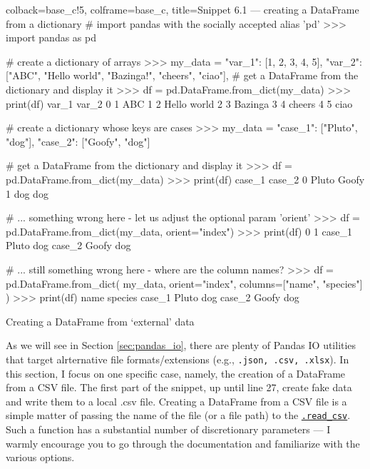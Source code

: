 \documentclass[a4paper,11pt]{book}
\numberwithin{figure}{chapter}
\numberwithin{table}{chapter}
\newcommand{\question}[1]{%
    \begin{tcolorbox}[colback=comp_c!10,colframe=comp_c,sidebyside align=top,width=\linewidth,before skip=1ex]
        #1
    \end{tcolorbox}
    \switchcolumn%
}
\newcommand{\note}[1]{%
    \begin{tcolorbox}[colback=white!0,colframe=white!10,width=\linewidth,before skip=1ex]
        #1
    \end{tcolorbox}
}
\begin{document}
\begin{pythoncode}[linenos=true,]{colback=base_c!5, colframe=base_c, title=\sffamily Snippet 6.1 --- creating a DataFrame from a dictionary}
# import pandas with the socially accepted alias 'pd'
>>> import pandas as pd

# create a dictionary of arrays
>>> my_data = {
        "var_1": [1, 2, 3, 4, 5],
        "var_2": ["ABC", "Hello world", "Bazinga!", "cheers", "ciao"],
    }
# get a DataFrame from the dictionary and display it
>>> df = pd.DataFrame.from_dict(my_data)
>>> print(df)
   var_1        var_2
0      1          ABC
1      2  Hello world
2      3      Bazinga
3      4       cheers
4      5         ciao

# create a dictionary whose keys are cases 
>>> my_data = {"case_1": ["Pluto", "dog"], "case_2": ["Goofy", "dog"]}


# get a DataFrame from the dictionary and display it
>>> df = pd.DataFrame.from_dict(my_data)
>>> print(df)
   case_1   case_2
0   Pluto    Goofy
1     dog      dog

# ... something wrong here - let us adjust the optional param 'orient'
>>> df = pd.DataFrame.from_dict(my_data, orient="index")
>>> print(df)
            0       1
case_1  Pluto     dog
case_2  Goofy     dog

# ... still something wrong here - where are the column names?
>>> df = pd.DataFrame.from_dict(
	my_data, orient="index",
	columns=["name", "species"]
	)
>>> print(df)
         name  species
case_1  Pluto      dog
case_2  Goofy      dog

\end{pythoncode}

\begin{paracol}{2}
	\question{\raggedright Creating a DataFrame from `external' data}
	\note{As we will see in Section \ref{sec:pandas_io}, there are plenty of Pandas IO utilities that target alrternative file formats/extensions (e.g., \texttt{.json, .csv, .xlsx}). In this section, I focus on one specific case, namely, the creation of a DataFrame from a CSV file. The first part of the snippet, up until line 27, create fake data and write them to a local .csv file. Creating a DataFrame from a CSV file is a simple matter of passing the name of the file (or a file path) to the \href{https://pandas.pydata.org/docs/reference/api/pandas.read_csv.html?highlight=read_csv#pandas.read_csv}{\texttt{.read\_csv}}. Such a function has a substantial number of discretionary parameters --- I warmly encourage you to go through the documentation and familiarize with the various options.}
\end{paracol}
\end{document}
